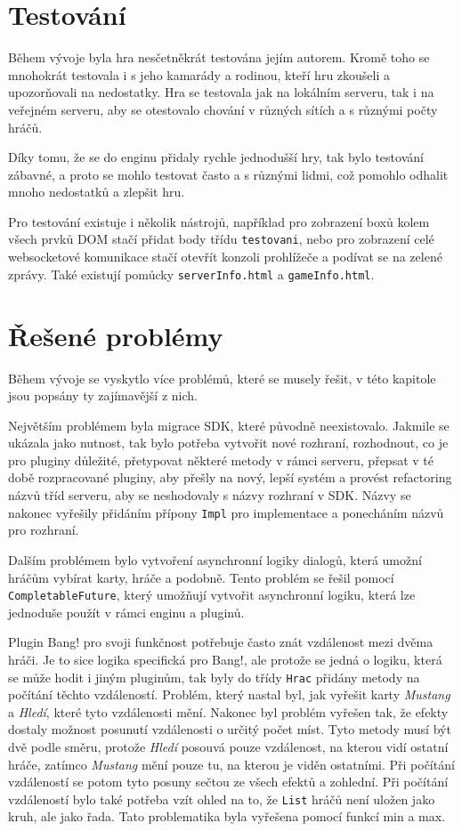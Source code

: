 \section{Testování}
Během vývoje byla hra nesčetněkrát testována jejím autorem. Kromě toho se mnohokrát testovala i s jeho kamarády a rodinou, kteří hru zkoušeli a upozorňovali na nedostatky. Hra se testovala jak na lokálním serveru, tak i na veřejném serveru, aby se otestovalo chování v různých sítích a s různými počty hráčů.

Díky tomu, že se do enginu přidaly rychle jednodušší hry, tak bylo testování zábavné, a proto se mohlo testovat často a s různými lidmi, což pomohlo odhalit mnoho nedostatků a zlepšit hru.

Pro testování existuje i několik nástrojů, například pro zobrazení boxů kolem všech prvků DOM stačí přidat body třídu \texttt{testovani}, nebo pro zobrazení celé websocketové komunikace stačí otevřít konzoli prohlížeče a podívat se na zelené zprávy. Také existují pomůcky \texttt{serverInfo.html} a \texttt{gameInfo.html}.

\section{Řešené problémy}
Během vývoje se vyskytlo více problémů, které se musely řešit, v této kapitole jsou popsány ty zajímavější z nich.

Největším problémem byla migrace SDK, které původně neexistovalo. Jakmile se ukázala jako nutnost, tak bylo potřeba vytvořit nové rozhraní, rozhodnout, co je pro pluginy důležité, přetypovat některé metody v rámci serveru, přepsat v té době rozpracované pluginy, aby přešly na nový, lepší systém a provést refactoring názvů tříd serveru, aby se neshodovaly s názvy rozhraní v SDK. Názvy se nakonec vyřešily přidáním přípony \texttt{Impl} pro implementace a ponecháním názvů pro rozhraní.

Dalším problémem bylo vytvoření asynchronní logiky dialogů, která umožní hráčům vybírat karty, hráče a podobně. Tento problém se řešil pomocí \texttt{CompletableFuture}, který umožňují vytvořit asynchronní logiku, která lze jednoduše použít v rámci enginu a pluginů.

Plugin Bang! pro svoji funkčnost potřebuje často znát vzdálenost mezi dvěma hráči. Je to sice logika specifická pro Bang!, ale protože se jedná o logiku, která se může hodit i jiným pluginům, tak byly do třídy \texttt{Hrac} přidány metody na počítání těchto vzdáleností. Problém, který nastal byl, jak vyřešit karty \emph{Mustang} a \emph{Hledí}, které tyto vzdálenosti mění. Nakonec byl problém vyřešen tak, že efekty dostaly možnost posunutí vzdálenosti o určitý počet míst. Tyto metody musí být dvě podle směru, protože \emph{Hledí} posouvá pouze vzdálenost, na kterou vidí ostatní hráče, zatímco \emph{Mustang} mění pouze tu, na kterou je viděn ostatními. Při počítání vzdáleností se potom tyto posuny sečtou ze všech efektů a zohlední. Při počítání vzdáleností bylo také potřeba vzít ohled na to, že \texttt{List} hráčů není uložen jako kruh, ale jako řada. Tato problematika byla vyřešena pomocí funkcí min a max.

